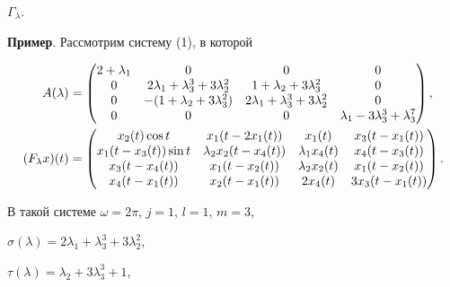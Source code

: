 $\Gamma_\lambda$. 


\medskip 


 


{\bf Пример}. Рассмотрим систему (1), в которой 


\begin{align} 


A(\lambda)&= 


\begin{pmatrix} 


2+\lambda_1 & 0 & 0 & 0 \\ 


0 & 2\lambda_1+\lambda^3_3+3\lambda^2_2 & 


1+\lambda_2+3\lambda^2_3 & 0 \\ 


0 & -(1+\lambda_2+3\lambda^2_3) & 


2\lambda_1+\lambda^3_3+3\lambda^2_2 & 0 \\ 


0 & 0 & 0 & \lambda_1-3\lambda^3_3+\lambda^7_3 


\end{pmatrix} 


,\notag \\ 


(F_\lambda x)(t)&= 


\begin{pmatrix} 


x_2(t)\cos t & x_1(t-2x_1(t)) & x_1(t) & x_3(t-x_1(t)) \\ 


x_1(t-x_3(t))\sin t & \lambda_2x_2(t-x_4(t)) & 


\lambda_1x_4(t) & x_4(t-x_3(t)) \\ 


x_3(t-x_4(t)) & x_1(t-x_2(t)) & \lambda_2x_2(t) & x_1(t-x_2(t)) \\ 


x_4(t-x_1(t)) & x_2(t-x_1(t)) & 2x_4(t) & 3x_3(t-x_1(t)) 


\end{pmatrix} 


. 


\end{align} 


В такой системе $\omega=2\pi$, $j=1$, $l=1$, $m=3$, 


$\sigma(\lambda)=2\lambda_1+\lambda^3_3+3\lambda^2_2$, 


$\tau(\lambda)=\lambda_2+3\lambda^3_3+1$, 



